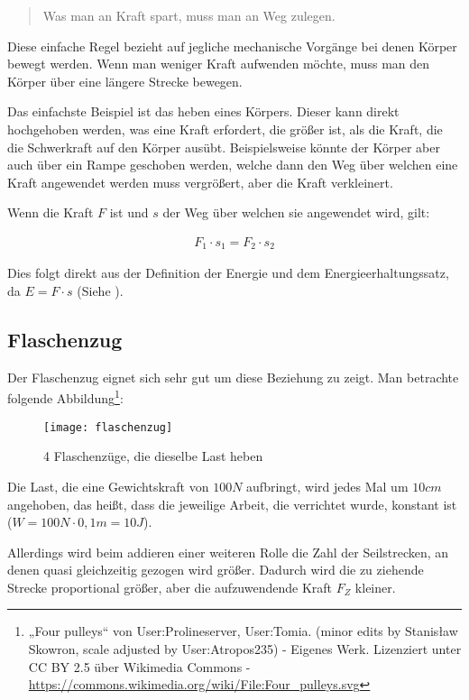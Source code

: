 \begin{quote}
	\glqq Was man an Kraft spart, muss man an Weg zulegen.\grqq
\end{quote}

\noindent Diese einfache Regel bezieht auf jegliche mechanische Vorgänge bei denen Körper bewegt werden. Wenn man weniger Kraft aufwenden möchte, muss man den Körper über eine längere Strecke bewegen. 

Das einfachste Beispiel ist das heben eines Körpers. Dieser kann direkt hochgehoben werden, was eine Kraft erfordert, die größer ist, als die Kraft, die die Schwerkraft auf den Körper ausübt. Beispielsweise könnte der Körper aber auch über ein Rampe geschoben werden, welche dann den Weg über welchen eine Kraft angewendet werden muss vergrößert, aber die Kraft verkleinert. 

Wenn die Kraft $F$ ist und $s$ der Weg über welchen sie angewendet wird, gilt:

\begin{align}
	F_{1} \cdot s_1 = F_{2} \cdot s_2
\end{align}

\noindent Dies folgt direkt aus der Definition der Energie und dem Energieerhaltungssatz, da $E=F \cdot s$ (Siehe ).

\subsection{Flaschenzug}

Der Flaschenzug eignet sich sehr gut um diese Beziehung zu zeigt. Man betrachte folgende Abbildung\footnote{„Four pulleys“ von User:Prolineserver, User:Tomia. (minor edits by Stanisław Skowron, scale adjusted by User:Atropos235) - Eigenes Werk. Lizenziert unter CC BY 2.5 über Wikimedia Commons - \url{https://commons.wikimedia.org/wiki/File:Four_pulleys.svg}}:

\begin{figure}[h!]
	\texttt{[image: flaschenzug]}
	\caption{4 Flaschenzüge, die dieselbe Last heben}
	\label{fig:flaschenzug}
\end{figure}

Die Last, die eine Gewichtskraft von $100N$ aufbringt, wird jedes Mal um $10cm$ angehoben, das heißt, dass die jeweilige Arbeit, die verrichtet wurde, konstant ist ($W = 100N \cdot 0,1m = 10J$).

Allerdings wird beim addieren einer weiteren Rolle die Zahl der Seilstrecken, an denen quasi gleichzeitig gezogen wird größer. Dadurch wird die zu ziehende Strecke proportional größer, aber die aufzuwendende Kraft $F_Z$ kleiner.


